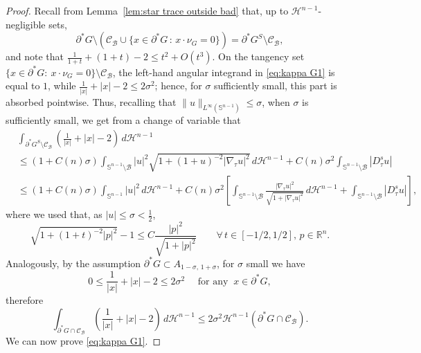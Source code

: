 \documentclass[reqno,11pt]{amsart}
\def\sz{\sigma}
\newcommand{\R}{\mathbb R}
\numberwithin{equation}{section}
\theoremstyle{remark}
\begin{document}
\begin{proof}
Recall from Lemma~\ref{lem:star trace outside bad} that, up to $\mathscr H^{n-1}$-negligible sets,
$$\partial^*G\setminus(\mathcal C_{\mathcal B}\cup\big\{x \in \partial^*G\,:\, x\cdot \nu_{G}=0\big\})
=\partial^*G^S\setminus\mathcal C_{\mathcal B},$$
and note that $\frac1{1+t}+(1+t)-2\leq t^2+O(t^3)$. On the tangency set
$\{x\in\partial^*G:\ x\cdot\nu_G=0\}\setminus\mathcal C_{\mathcal B}$, the
left-hand angular integrand in \eqref{eq:kappa G1} is equal to $1$, while
$\frac1{|x|}+|x|-2\le 2\sigma^2$; hence, for $\sigma$ sufficiently small, this
part is absorbed pointwise. Thus, recalling that $\|u\|_{L^\infty(\mathbb S^{n-1})}\le \sz$, when $\sigma$ is sufficiently small, we get from a change of variable that
\begin{equation}\label{volume term F}
    \begin{split}
 &\int_{\partial^* G^S\setminus \mathcal{C}_{\mathcal B}} \left(\frac{1}{|x|}+|x|-2\right) \,   d\mathscr H^{n-1}\\
 & \leq  (1+C(n) \sz)\int_{\mathbb S^{n-1}\setminus \mathcal B} |u|^2 \sqrt{1+(1+u)^{-2} |\nabla_\tau u|^2}\,  d\mathscr H^{n-1} + C(n) \sz^2 \int_{\mathbb S^{n-1}\setminus \mathcal B}|D^s_\tau u|  \\
& \leq (1+C(n) \sz)\int_{\mathbb S^{n-1}} |u|^2  \,  d\mathscr H^{n-1} +C(n) \sz^2 \left[\int_{\mathbb S^{n-1}\setminus \mathcal B} \frac{|\nabla_\tau u|^2}{\sqrt{1+|\nabla_\tau u|^2}}    \,  d\mathscr H^{n-1} + \int_{\mathbb S^{n-1}\setminus \mathcal B}|D^s_\tau u|\right],
    \end{split}
\end{equation}
where we used that, as $|u|\le \sz<\frac 1 2$,
$$
\sqrt{1+(1+t)^{-2} |p|^2} -1\leq C\frac{|p|^2}{\sqrt{1+|p|^2}} \qquad \forall\,t \in [-1/2,1/2],\,p\in\R^n.
$$
Analogously,  by the assumption $\partial^* G\subset A_{1-\sz,\,1+\sz}$, for $\sigma$ small we have
\begin{equation}
\label{eq:sigma G}
0\le  \frac{1}{|x|}+|x|-2 \le 2\sz^2  \quad \text{ for any } \ x\in \partial^* G,
\end{equation}
therefore
\begin{equation}\label{error volume term}
 \int_{\partial^* G \cap \mathcal{C}_{\mathcal B}} \left(\frac{1}{|x|}+|x|-2\right) \,  d\mathscr H^{n-1}
\le 2 \sz^2 \mathscr H^{n-1}(\partial^* G\cap \mathcal{C}_{\mathcal B}). 
\end{equation}
We can now prove \eqref{eq:kappa G1}.


\end{proof}
\end{document}
